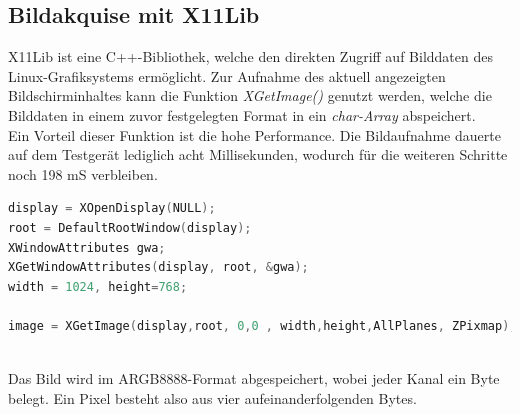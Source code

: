 \subsection{Bildakquise mit X11Lib}
X11Lib ist eine C++-Bibliothek, welche den direkten Zugriff auf Bilddaten des Linux-Grafiksystems ermöglicht. Zur Aufnahme des aktuell angezeigten Bildschirminhaltes kann die Funktion \textit{XGetImage()} genutzt werden, welche die Bilddaten in einem zuvor festgelegten Format in ein \textit{char-Array} abspeichert.\\
Ein Vorteil dieser Funktion ist die hohe Performance. Die Bildaufnahme dauerte auf dem Testgerät lediglich acht Millisekunden, wodurch für die weiteren Schritte noch 198 mS verbleiben.

\begin{lstlisting}[caption=Bildaufnahme mittels X11Lib, label=lst:capture_x11lib, language=C++]
display = XOpenDisplay(NULL);
root = DefaultRootWindow(display);
XWindowAttributes gwa;
XGetWindowAttributes(display, root, &gwa);
width = 1024, height=768;

image = XGetImage(display,root, 0,0 , width,height,AllPlanes, ZPixmap);
\end{lstlisting}
~\\
Das Bild wird im ARGB8888-Format abgespeichert, wobei jeder Kanal ein Byte belegt. Ein Pixel besteht also aus vier aufeinanderfolgenden Bytes.

